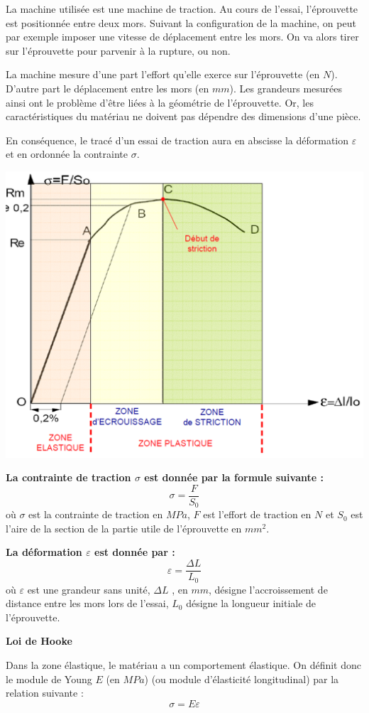 \documentclass[11pt,oneside]{article}
\begin{document}
La machine utilisée est une machine de traction. Au cours de l'essai, l'éprouvette est positionnée entre deux mors. Suivant la configuration de la machine, on peut par exemple imposer une vitesse de déplacement entre les mors. On va alors tirer sur l'éprouvette pour parvenir à la rupture, ou non.

La machine mesure d'une part l'effort qu'elle exerce sur l'éprouvette (en $N$). D'autre part le déplacement entre les mors (en $mm$). Les grandeurs mesurées ainsi ont le problème d'être liées à la géométrie de l'éprouvette. Or, les caractéristiques du matériau ne doivent pas dépendre des dimensions d'une pièce. 

En conséquence, le tracé d'un essai de traction aura en abscisse la déformation $\varepsilon$ et en ordonnée la contrainte $\sigma$.


\begin{center}
\includegraphics[width=.7\textwidth]{png/courbe_traction}
\end{center}
\begin{defi}
\textbf{La contrainte de traction $\sigma$ est donnée par la formule suivante :}
$$
\sigma  = \dfrac{F}{S_0}
$$
où $\sigma$ est la contrainte de traction en $MPa$, $F$ est l'effort de traction en $N$ et $S_0$ est l'aire de la section de la partie utile de l'éprouvette en $mm^2$.

\textbf{La déformation $\varepsilon$ est donnée par :}
$$
\varepsilon = \dfrac{\Delta L}{L_0}
$$
où $\varepsilon$ est une grandeur sans unité, $\Delta L$ , en $mm$, désigne l'accroissement de distance entre les mors lors de l'essai, $L_0$ désigne la longueur initiale de l'éprouvette.
\end{defi}

\begin{resultat}
\textbf{Loi de Hooke}

Dans la zone élastique, le matériau a un comportement élastique. On définit donc le module de Young $E$ (en $MPa$) (ou module d'élasticité longitudinal) par la relation suivante :
$$
\sigma = E \varepsilon
$$
\end{resultat}
\end{document}
